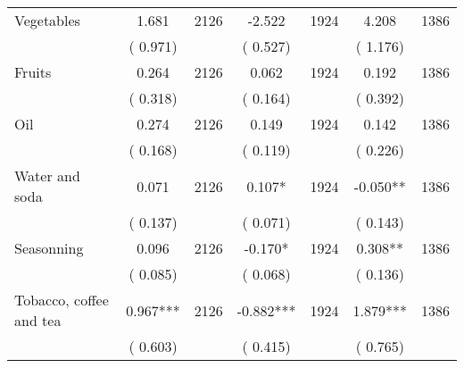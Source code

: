 \begin{tabular}{l*{6}{c}}
Vegetables        &              1.681      &       2126       &             -2.522      &       1924       &              4.208      &       1386       \\
                       &       (       0.971)            &                               &       (       0.527)            &                               &       (       1.176)            &                               \\
Fruits        &              0.264      &       2126       &              0.062      &       1924       &              0.192      &       1386       \\
                       &       (       0.318)            &                               &       (       0.164)            &                               &       (       0.392)            &                               \\
Oil        &              0.274      &       2126       &              0.149      &       1924       &              0.142      &       1386       \\
                       &       (       0.168)            &                               &       (       0.119)            &                               &       (       0.226)            &                               \\
Water and soda        &              0.071      &       2126       &              0.107*      &       1924       &             -0.050**      &       1386       \\
                       &       (       0.137)            &                               &       (       0.071)            &                               &       (       0.143)            &                               \\
Seasonning        &              0.096      &       2126       &             -0.170*      &       1924       &              0.308**      &       1386       \\
                       &       (       0.085)            &                               &       (       0.068)            &                               &       (       0.136)            &                               \\
Tobacco, coffee and tea        &              0.967***      &       2126       &             -0.882***      &       1924       &              1.879***      &       1386       \\
                       &       (       0.603)            &                               &       (       0.415)            &                               &       (       0.765)            &                               \\
\hline \end{tabular}